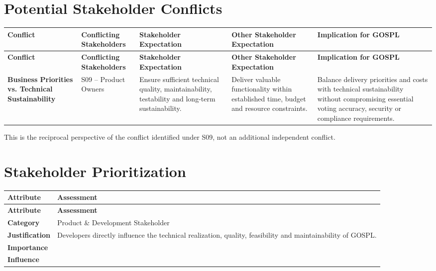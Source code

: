 \documentclass[11pt,a4paper]{article}
\begin{document}

\section*{Potential Stakeholder Conflicts}

\begingroup\small
\begin{longtable}{@{}>{\raggedright\arraybackslash}p{}>{\raggedright\arraybackslash}p{}>{\raggedright\arraybackslash}p{}>{\raggedright\arraybackslash}p{}>{\raggedright\arraybackslash}p{}@{}}
\toprule
\textbf{Conflict} & \textbf{Conflicting Stakeholders} & \textbf{Stakeholder Expectation} & \textbf{Other Stakeholder Expectation} & \textbf{Implication for GOSPL} \\
\midrule
\endfirsthead
\toprule
\textbf{Conflict} & \textbf{Conflicting Stakeholders} & \textbf{Stakeholder Expectation} & \textbf{Other Stakeholder Expectation} & \textbf{Implication for GOSPL} \\
\midrule
\endhead
\bottomrule
\endfoot
\textbf{Business Priorities vs. Technical Sustainability} & S09 -- Product Owners & Ensure sufficient technical quality, maintainability, testability and long-term sustainability. & Deliver valuable functionality within established time, budget and resource constraints. & Balance delivery priorities and costs with technical sustainability without compromising essential voting accuracy, security or compliance requirements. \\
\end{longtable}
\endgroup

This is the reciprocal perspective of the conflict identified under S09, not an additional independent conflict.


\section*{Stakeholder Prioritization}

\begingroup\small
\begin{longtable}{@{}>{\raggedright\arraybackslash}p{}>{\raggedright\arraybackslash}p{}@{}}
\toprule
\textbf{Attribute} & \textbf{Assessment} \\
\midrule
\endfirsthead
\toprule
\textbf{Attribute} & \textbf{Assessment} \\
\midrule
\endhead
\bottomrule
\endfoot
\textbf{Category} & Product \& Development Stakeholder \\
\addlinespace
\textbf{Justification} & Developers directly influence the technical realization, quality, feasibility and maintainability of GOSPL. \\
\addlinespace
\textbf{Importance} & 4 \\
\addlinespace
\textbf{Influence} & 5 \\
\end{longtable}
\endgroup
\end{document}
